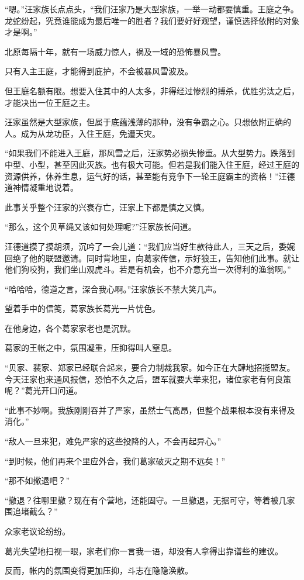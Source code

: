 \begin{this_body}
“嗯。”汪家族长点点头，“我们汪家乃是大型家族，一举一动都要慎重。王庭之争。龙蛇纷起，究竟谁能成为最后唯一的胜者？我们要好好观望，谨慎选择依附的对象才是啊。”

北原每隔十年，就有一场威力惊人，祸及一域的恐怖暴风雪。

只有入主王庭，才能得到庇护，不会被暴风雪波及。

但王庭名额有限。想要入住其中的人太多，非得经过惨烈的搏杀，优胜劣汰之后，才能决出一位王庭之主。

汪家虽然是大型家族，但属于底蕴浅薄的那种，没有争霸之心。只想依附正确的人。成为从龙功臣，入住王庭，免遭天灾。

“如果我们不能进入王庭，那风雪之后，汪家势必损失惨重。从大型势力。跌落到中型、小型，甚至因此灭族。也有极大可能。但若是我们能入住王庭，经过王庭的资源供养，休养生息，运气好的话，甚至能有竞争下一轮王庭霸主的资格！”汪德道神情凝重地说着。

此事关乎整个汪家的兴衰存亡，汪家上下都是慎之又慎。

“那么，这个贝草绳又该如何处理呢?”汪家族长问道。

汪德道摸了摸胡须，沉吟了一会儿道：“我们应当好生款待此人，三天之后，委婉回绝了他的联盟邀请。同时背地里，向葛家传信，示好狼王，告知他们此事。就让他们狗咬狗，我们坐山观虎斗。若是有机会，也不介意充当一次得利的渔翁啊。”

“哈哈哈，德道之言，深合我心啊。”汪家族长不禁大笑几声。

望着手中的信笺，葛家族长葛光一片忧色。

在他身边，各个葛家家老也是沉默。

葛家的王帐之中，氛围凝重，压抑得叫人窒息。

“贝家、裴家、郑家已经联合起来，要合力制裁我家。如今正在大肆地招揽盟友。今天汪家也来通风报信，恐怕不久之后，盟军就要大举来犯，诸位家老有何良策呢？”葛光开口问道。

“此事不妙啊。我族刚刚吞并了严家，虽然士气高昂，但整个战果根本没有来得及消化。”

“敌人一旦来犯，难免严家的这些投降的人，不会再起异心。”

“到时候，他们再来个里应外合，我们葛家破灭之期不远矣！”

“那不如撤退吧？”

“撤退？往哪里撤？现在有个营地，还能固守。一旦撤退，无据可守，等着被几家围追堵截么？”

众家老议论纷纷。

葛光失望地扫视一眼，家老们你一言我一语，却没有人拿得出靠谱些的建议。

反而，帐内的氛围变得更加压抑，斗志在隐隐涣散。


\end{this_body}
